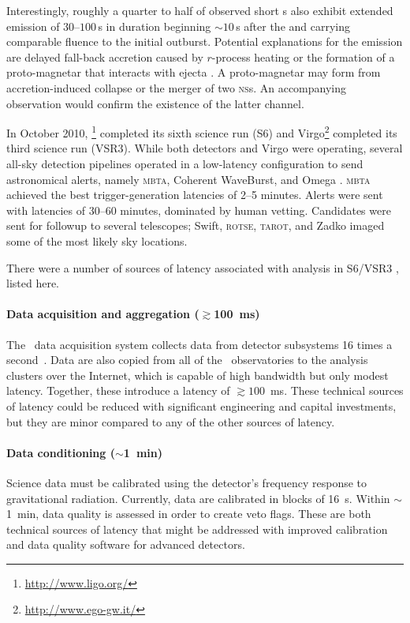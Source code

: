Interestingly, roughly a quarter to half of observed short
\GRB{}s also exhibit extended emission of $30$--$100$\,s in duration beginning
$\sim$$10$\,s after the \GRB{} and carrying comparable fluence to the initial
outburst.  Potential explanations for the emission are delayed fall-back
accretion caused by $r$-process heating \citep{Metzger2010} or the formation of
a proto-magnetar that interacts with ejecta \citep{Bucciantini2011}.  A
proto-magnetar may form from accretion-induced collapse or the merger of two
\textsc{ns}s.  An accompanying \GW{} observation would confirm the existence of
the latter channel.

In October 2010, \LIGO{}\footnote{\url{http://www.ligo.org/}} completed its
sixth science run (S6) and Virgo\footnote{\url{http://www.ego-gw.it/}}
completed its third science run (VSR3).  While both \LIGO{} detectors and Virgo
were operating, several all-sky detection pipelines operated in a low-latency
configuration to send astronomical alerts, namely \textsc{mbta}, Coherent
WaveBurst, and Omega \citep{HugheyGWPAW2011, S6lowlatency2, S6lowlatency3, S6lowlatency4}.
\textsc{mbta} achieved the best \GW{} trigger-generation latencies of 2--5 minutes.
Alerts were sent with latencies of 30--60 minutes, dominated by human vetting.
Candidates were sent for \EM{} followup to several telescopes; Swift,
\textsc{rotse}, \textsc{tarot}, and Zadko \citep{kanner2008, HugheyGWPAW2011}
imaged some of the most likely sky locations.

There were a number of sources of latency associated with \CBC{}
analysis in S6/VSR3 \citep{HugheyGWPAW2011}, listed here.

\paragraph{Data acquisition and aggregation ($\gtrsim$100~ms)}%
The \LIGO\ data acquisition system collects data from detector subsystems 16
times a second~\citep{Bork2001}. Data are also copied from all of the \GW\
observatories to the analysis clusters over the Internet, which is capable of
high bandwidth but only modest latency.  Together, these introduce a
latency of $\gtrsim 100$~ms.  These technical sources of latency could be reduced
with significant engineering and capital investments, but they are minor compared
to any of the other sources of latency.

\paragraph{Data conditioning ($\sim$1~min)}%
Science data must be calibrated using the detector's frequency
response to gravitational radiation.  Currently, data are calibrated in blocks of
16~s.  Within $\sim$1~min, data quality is assessed in order to create veto flags.
These are both technical sources of latency that might be addressed with improved
calibration and data quality software for advanced detectors.


